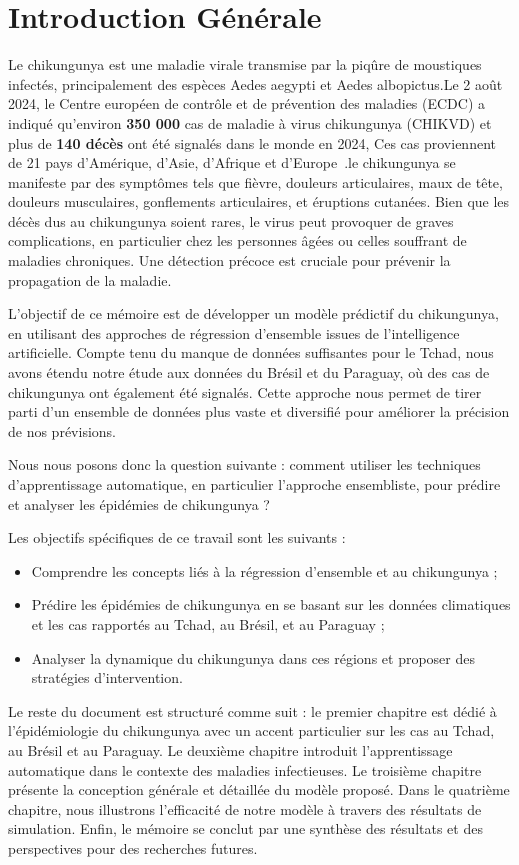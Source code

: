 \chapter*{Introduction Générale}

Le chikungunya est une maladie virale transmise par la piqûre de moustiques infectés, principalement des espèces Aedes aegypti et Aedes albopictus.Le 2 août 2024, le Centre européen de contrôle et de prévention des maladies (ECDC) a indiqué qu'environ \textbf{350 000} cas de maladie à virus chikungunya (CHIKVD) et plus de \textbf{140 décès} ont été signalés dans le monde en 2024, Ces cas proviennent de 21 pays d'Amérique, d'Asie, d'Afrique et d'Europe~\cite{chikvecdc}.le chikungunya se manifeste par des symptômes tels que fièvre, douleurs articulaires, maux de tête, douleurs musculaires, gonflements articulaires, et éruptions cutanées. Bien que les décès dus au chikungunya soient rares, le virus peut provoquer de graves complications, en particulier chez les personnes âgées ou celles souffrant de maladies chroniques. Une détection précoce est cruciale pour prévenir la propagation de la maladie.

L'objectif de ce mémoire est de développer un modèle prédictif du chikungunya, en utilisant des approches de régression d'ensemble issues de l'intelligence artificielle. Compte tenu du manque de données suffisantes pour le Tchad, nous avons étendu notre étude aux données du Brésil et du Paraguay, où des cas de chikungunya ont également été signalés. Cette approche nous permet de tirer parti d'un ensemble de données plus vaste et diversifié pour améliorer la précision de nos prévisions.

Nous nous posons donc la question suivante : comment utiliser les techniques d'apprentissage automatique, en particulier l'approche ensembliste, pour prédire et analyser les épidémies de chikungunya ?

Les objectifs spécifiques de ce travail sont les suivants :
\begin{itemize}
	\item Comprendre les concepts liés à la régression d'ensemble et au chikungunya ;
	\item Prédire les épidémies de chikungunya en se basant sur les données climatiques et les cas rapportés au Tchad, au Brésil, et au Paraguay ;
	\item Analyser la dynamique du chikungunya dans ces régions et proposer des stratégies d'intervention.
\end{itemize}

Le reste du document est structuré comme suit : le premier chapitre est dédié à l'épidémiologie du chikungunya avec un accent particulier sur les cas au Tchad, au Brésil et au Paraguay. Le deuxième chapitre introduit l'apprentissage automatique dans le contexte des maladies infectieuses. Le troisième chapitre présente la conception générale et détaillée du modèle proposé. Dans le quatrième chapitre, nous illustrons l'efficacité de notre modèle à travers des résultats de simulation. Enfin, le mémoire se conclut par une synthèse des résultats et des perspectives pour des recherches futures.

